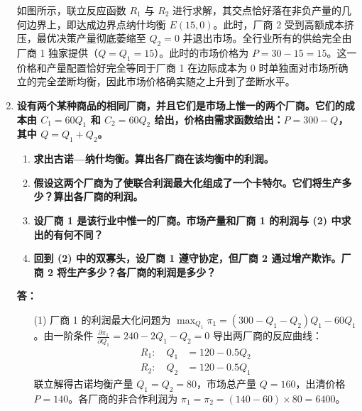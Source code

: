 \begin{enumerate}[label=\textbf{\arabic*.}, leftmargin=*]
\begin{center}
		\end{center}
		
		如图所示，联立反应函数 $R_1$ 与 $R_2$ 进行求解，其交点恰好落在非负产量的几何边界上，即达成边界点纳什均衡 $E(15,0)$。此时，厂商 2 受到高额成本挤压，最优决策产量彻底萎缩至 $Q_2 = 0$ 并退出市场。全行业所有的供给完全由厂商 1 独家提供（$Q = Q_1 = 15$）。此时的市场价格为 $P = 30 - 15 = 15$。这一价格和产量配置恰好完全等同于厂商 1 在边际成本为 0 时单独面对市场所确立的完全垄断均衡，因此市场价格确实随之上升到了垄断水平。
		
		\newpage
		\item \textbf{设有两个某种商品的相同厂商，并且它们是市场上惟一的两个厂商。它们的成本由 $C_1 = 60Q_1$ 和 $C_2 = 60Q_2$ 给出，价格由需求函数给出：$P = 300 - Q$，其中 $Q = Q_1 + Q_2$。}
		
		\begin{enumerate}
			\item \textbf{求出古诺—纳什均衡。算出各厂商在该均衡中的利润。}
			\item \textbf{假设这两个厂商为了使联合利润最大化组成了一个卡特尔。它们将生产多少？算出各厂商的利润。}
			\item \textbf{设厂商 1 是该行业中惟一的厂商。市场产量和厂商 1 的利润与 (2) 中求出的有何不同？}
			\item \textbf{回到 (2) 中的双寡头，设厂商 1 遵守协定，但厂商 2 通过增产欺诈。厂商 2 将生产多少？各厂商的利润是多少？}
		\end{enumerate}
		
		\textbf{答：}
		\begin{enumerate}
			\item[(1)] 厂商 1 的利润最大化问题为 $\max_{Q_1} \pi_1 = (300 - Q_1 - Q_2)Q_1 - 60Q_1$。由一阶条件 $\frac{\partial\pi_1}{\partial Q_1} = 240 - 2Q_1 - Q_2 = 0$ 导出两厂商的反应曲线：
			\[
			\begin{aligned}
				R_1: \quad Q_1 &= 120 - 0.5Q_2 \\
				R_2: \quad Q_2 &= 120 - 0.5Q_1
			\end{aligned}
			\]
			联立解得古诺均衡产量 $Q_1 = Q_2 = 80$，市场总产量 $Q = 160$，出清价格 $P = 140$。各厂商的非合作利润为 $\pi_1 = \pi_2 = (140 - 60) \times 80 = 6400$。
			

\end{enumerate}
\end{enumerate}
